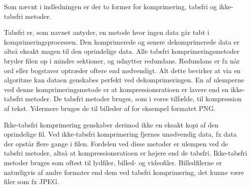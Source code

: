 Som nævnt i indledningen er der to former for komprimering, tabsfri og ikke-tabsfri metoder. 

Tabsfri er, som navnet antyder, en metode hvor ingen data går tabt i komprimeringsprocessen. Den komprimerede og senere dekomprimerede data er altså eksakt magen til den oprindelige data. Alle tabsfri komprimeringsmetoder bryder filen op i mindre sektioner, og udnytter redundans. Redundans er fx når ord eller bogstaver optræder oftere end nødvendigt. Alt dette bevirker at via en algoritme kan dataen genskabes perfekt ved dekomprimeringen. En af ulemperne ved denne komprimeringsmetode er at kompressionsratioen er lavere end en ikke-tabsfri metoder\cite{wisegeek}. De tabsfri metoder bruges, som i vores tilfælde, til kompression af tekst. Ydermere bruges de til billeder af for eksempel formatet PNG. 

Ikke-tabsfri komprimering genskaber derimod ikke en eksakt kopi af den oprindelige fil. Ved ikke-tabsfri komprimering fjernes unødvendig data, fx data der opstår flere gange i filen. Fordelen ved disse metoder er ulempen ved de tabsfri metoder, altså at kompressionsratioen er højere end de tabsfri. Ikke-tabsfri metoder bruges som oftest til lydfiler, billed- og videofiler\cite{maximum}. Billedfilerne er naturligvis af andre formater end dem ved tabsfri komprimering, det kunne være filer som fx JPEG.
